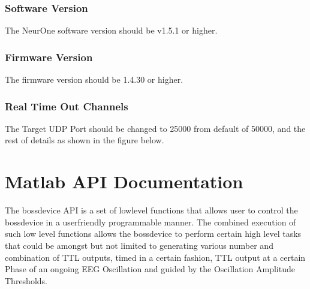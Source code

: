 \documentclass[letterpaper,10pt,english]{sphinxmanual}
\begin{document}
\subsection{Software Version}
\label{\detokenize{3_setup_biosignal_amplifier:software-version}}
\sphinxAtStartPar
The NeurOne software version should be v1.5.1 or higher.

\begin{figure}[htbp]
\centering

\noindent{}
\end{figure}


\subsection{Firmware Version}
\label{\detokenize{3_setup_biosignal_amplifier:firmware-version}}
\sphinxAtStartPar
The firmware version should be 1.4.30 or higher.


\subsection{Real Time Out Channels}
\label{\detokenize{3_setup_biosignal_amplifier:real-time-out-channels}}
\sphinxAtStartPar
The Target UDP Port should be changed to 25000 from default of 50000, and the rest of details as shown in the figure below.

\begin{figure}[htbp]
\centering

\noindent{}
\end{figure}


\chapter{Matlab API Documentation}
\label{\detokenize{4_api_documentation:matlab-api-documentation}}\label{\detokenize{4_api_documentation::doc}}
\sphinxAtStartPar
The bossdevice API is a set of low\sphinxhyphen{}level functions that allows user to control the bossdevice in a user\sphinxhyphen{}friendly programmable manner. The combined execution of such low level functions allows the bossdevice to perform certain high level tasks that could be amongst but not limited to generating various number and combination of TTL outputs, timed in a certain fashion, TTL output at a certain Phase of an ongoing EEG Oscillation and guided by the Oscillation Amplitude Thresholds.
\end{document}
